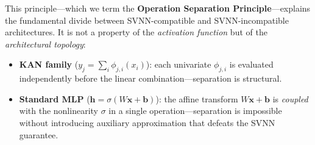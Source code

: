 This principle---which we term the \textbf{Operation Separation
Principle}---explains the fundamental divide between SVNN-compatible
and SVNN-incompatible architectures. It is not a property of the
\textit{activation function} but of the \textit{architectural
topology}:

\begin{itemize}
    \item \textbf{KAN family} ($y_j = \sum_i \phi_{j,i}(x_i)$):
    each univariate $\phi_{j,i}$ is evaluated independently before
    the linear combination---separation is structural.
    \item \textbf{Standard MLP} ($\mathbf{h} = \sigma(W\mathbf{x} + \mathbf{b})$):
    the affine transform $W\mathbf{x} + \mathbf{b}$ is \textit{coupled}
    with the nonlinearity $\sigma$ in a single operation---separation
    is impossible without introducing auxiliary approximation that
    defeats the SVNN guarantee.
\end{itemize}

